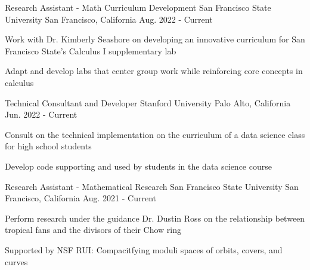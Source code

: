 \documentclass[../omelveny-cv]{subfiles}
\begin{document}


\begin{cventries}

    \cventry
    {Research Assistant - Math Curriculum Development}
    {San Francisco State University}
    {San Francisco, California}
    {Aug. 2022 - Current}
    {
        \begin{cvitems}
            \item {Work with Dr. Kimberly Seashore on developing an innovative curriculum for San Francisco State's Calculus I supplementary lab}
            \item {Adapt and develop labs that center group work while reinforcing core concepts in calculus}
        \end{cvitems}
    }

    \cventry
    {Technical Consultant and Developer}
    {Stanford University}
    {Palo Alto, California}
    {Jun. 2022 - Current}
    {
        \begin{cvitems}
            \item {Consult on the technical implementation on the curriculum of a data science class for high school students}
            \item {Develop code supporting and used by students in the data science course}
        \end{cvitems}
    }

    \cventry
    {Research Assistant - Mathematical Research}
    {San Francisco State University}
    {San Francisco, California}
    {Aug. 2021 - Current}
    {
        \begin{cvitems}
            \item {Perform research under the guidance Dr. Dustin Ross on the relationship between tropical fans and the divisors of their Chow ring}
            \item {Supported by NSF RUI: Compacitfying moduli spaces of orbits, covers, and curves}
        \end{cvitems}
    }


\end{cventries}
\end{document}
